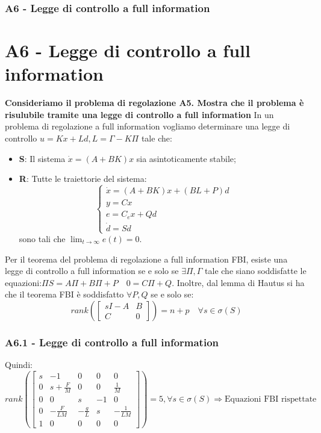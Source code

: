 \documentclass{beamer}
\begin{document}
\begin{frame}
	\frametitle{A6 - Legge di controllo a full information}%
	\section{A6 - Legge di controllo a full information}%
	\textbf{Consideriamo il problema di regolazione A5. Mostra che il problema è risulubile tramite una legge di controllo a full information}
	In un problema di regolazione a full information vogliamo determinare una legge di controllo \(u=Kx+Ld,L=\Gamma -K\Pi \) tale che:\begin{itemize}
		\item \textbf{S}: Il sistema \(\dot{x}=(A+BK)x\) sia asintoticamente stabile;
		\item \textbf{R}: Tutte le traiettorie del sistema:\begin{equation*}
			      \begin{cases}
				      \dot{x}=(A+BK)x+(BL+P)d \\
				      y=Cx                    \\
				      e=C_{e}x+Qd             \\
				      \dot{d}=Sd
			      \end{cases}
		      \end{equation*}
		      sono tali che \(\lim_{t\rightarrow \infty}e(t)=0\).
	\end{itemize}
	Per il teorema del problema di regolazione a full information FBI, esiste una legge di controllo a full information se e solo se \(\exists \Pi ,\Gamma \) tale che siano soddisfatte le equazioni:\(\Pi S= A\Pi +B\Pi+P\quad 0=C\Pi+Q\).
	Inoltre, dal lemma di Hautus si ha che il teorema FBI è soddisfatto \(\forall P,Q\) se e solo se:\begin{equation*}
		rank\left(\begin{bmatrix}
			sI-A & B \\C&0
		\end{bmatrix}\right)=n+p\quad \forall s\in \sigma(S)
	\end{equation*}
\end{frame}
\begin{frame}
	\frametitle{A6.1 - Legge di controllo a full information}%
	Quindi:\begin{equation*}
		rank\left(\begin{bmatrix}
				s & -1            & 0            & 0  & 0             \\
				0 & s+\frac{F}{M} & 0            & 0  & \frac{1}{M}   \\
				0 & 0             & s            & -1 & 0             \\
				0 & -\frac{F}{LM} & -\frac{g}{L} & s  & -\frac{1}{LM} \\
				1 & 0             & 0            & 0  & 0
			\end{bmatrix}\right)=5,\forall{s}\in\sigma(S)\Longrightarrow \text{Equazioni FBI rispettate}
	\end{equation*}
\end{frame}
\end{document}
